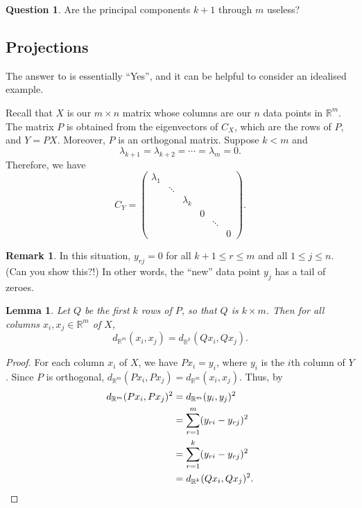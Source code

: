 \documentclass[a4paper, 12pt]{article}
\numberwithin{equation}{section}
\numberwithin{figure}{section}
\newtheorem{lem}[thm]{Lemma}
\theoremstyle{definition}
\newtheorem{remark}[thm]{Remark}
\newtheorem{quest}[thm]{Question}
\renewcommand{\leq}{\leqslant}
\newcommand{\R}{\mathbb{R}}
\begin{document}
\begin{quest}\label{quest:small-PC}
	Are the principal components $k+1$ through $m$ useless? 
\end{quest}

\subsection{Projections}

The answer to  is essentially ``Yes'', and it can be
helpful to consider an idealised example. 

Recall that $X$ is our $m\times n$ matrix whose columns are our $n$ data points
in $\R^m$. The matrix $P$ is obtained from the eigenvectors of $C_X$, which are
the rows of $P$, and $Y=PX$. Moreover, $P$ is an orthogonal matrix. Suppose $k <
m$ and 
\[ 
	\lambda_{k+1} = \lambda_{k+2} = \cdots = \lambda_m = 0. 
\]
Therefore, we have 
\[ 
	C_Y = \begin{pmatrix} 
		\lambda_1 & & & & & \\
		& \ddots & & & \\
		& & \lambda_k & & & \\
		& & & 0 & & \\
		& & & & \ddots & \\
		& & & & & 0
	\end{pmatrix} .
\] 

\begin{remark}\label{rem:tail-zeroes}
	In this situation, $y_{rj}=0$ for all $k+1 \leq r \leq m$ and all $1\leq j
	\leq n$. (Can you show this?!) In other words, the ``new'' data point $y_j$
	has a tail of zeroes. 
\end{remark}

\begin{lem}\label{lem:projection}
	Let $Q$ be the first $k$ rows of $P$, so that $Q$ is $k\times m$. Then for
	all columns $x_i,x_j\in\R^m$ of $X$, 
	\[ 
		d_{\R^m}(x_i, x_j) = d_{\R^k}(Qx_i, Qx_j).
	\] 
\end{lem}

\begin{proof} 
	For each column $x_i$ of $X$, we have $Px_i = y_i$, where $y_i$ is the $i$th
	column of $Y$. Since $P$ is orthogonal, $d_{\R^m}(Px_i, Px_j)= d_{\R^m}(x_i,
	x_j)$. Thus, by 
	\begin{align*}
		d_{\R^m}(Px_i, Px_j)^2 &= d_{\R^m}(y_i, y_j)^2 \\
		&= \sum_{r=1}^m (y_{ri} - y_{rj})^2 \\
		&= \sum_{r=1}^k (y_{ri} - y_{rj})^2 \\ 
		&= d_{\R^k}(Qx_i, Qx_j)^2. \qedhere
	\end{align*}
\end{proof}
\end{document}
